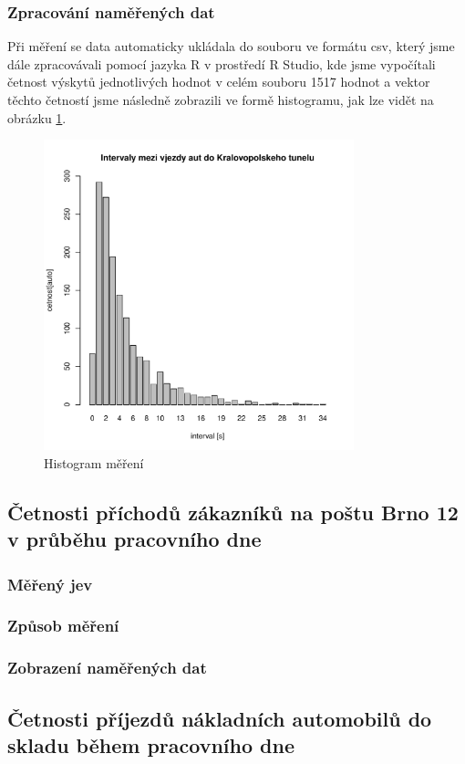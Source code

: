 \documentclass[11pt,a4paper]{article}
\begin{document}
		\subsubsection{Zpracování naměřených dat}
		Při měření se data automaticky ukládala do souboru ve formátu csv, který jsme dále zpracovávali
		pomocí jazyka R v prostředí R Studio, kde jsme vypočítali četnost výskytů jednotlivých hodnot v
		celém souboru 1517 hodnot a vektor těchto četností jsme následně zobrazili ve formě histogramu, jak 
		lze vidět na obrázku \ref{tunel}.
		\begin{figure}[ht!]
		\centering
		\includegraphics[width=90mm]{../measuring/tunelBarPlot.pdf}
		\caption{Histogram měření}
		\label{tunel}
		\end{figure}

	\subsection{Četnosti příchodů zákazníků na poštu Brno 12 v průběhu pracovního dne}
		\subsubsection{Měřený jev}
		\subsubsection{Způsob měření}
		\subsubsection{Zobrazení naměřených dat}

	\subsection{Četnosti příjezdů nákladních automobilů do skladu během pracovního dne}
\end{document}
